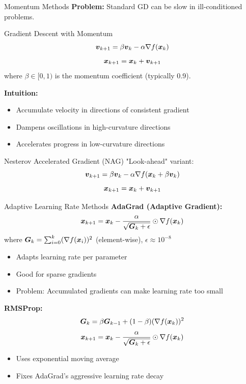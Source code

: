 \documentclass[aspectratio=169]{beamer}
\begin{document}
\begin{frame}{Momentum Methods}
  \textbf{Problem:} Standard GD can be slow in ill-conditioned problems.

  \vspace{0.5em}

  \begin{definitionbox}{Gradient Descent with Momentum}
    $$\boldsymbol{v}_{k+1} = \beta \boldsymbol{v}_k - \alpha \nabla f(\boldsymbol{x}_k)$$
    $$\boldsymbol{x}_{k+1} = \boldsymbol{x}_k + \boldsymbol{v}_{k+1}$$
    where $\beta \in [0,1)$ is the momentum coefficient (typically 0.9).
  \end{definitionbox}

  \vspace{0.5em}

  \textbf{Intuition:}
  \begin{itemize}
    \item Accumulate velocity in directions of consistent gradient
    \item Dampens oscillations in high-curvature directions
    \item Accelerates progress in low-curvature directions
  \end{itemize}

  \vspace{0.5em}

  \begin{definitionbox}{Nesterov Accelerated Gradient (NAG)}
    "Look-ahead" variant:
    $$\boldsymbol{v}_{k+1} = \beta \boldsymbol{v}_k - \alpha \nabla f(\boldsymbol{x}_k + \beta \boldsymbol{v}_k)$$
    $$\boldsymbol{x}_{k+1} = \boldsymbol{x}_k + \boldsymbol{v}_{k+1}$$
  \end{definitionbox}
\end{frame}

\begin{frame}{Adaptive Learning Rate Methods}
  \textbf{AdaGrad (Adaptive Gradient):}
  $$\boldsymbol{x}_{k+1} = \boldsymbol{x}_k - \frac{\alpha}{\sqrt{\boldsymbol{G}_k + \epsilon}} \odot \nabla f(\boldsymbol{x}_k)$$
  where $\boldsymbol{G}_k = \sum_{i=0}^k (\nabla f(\boldsymbol{x}_i))^2$ (element-wise), $\epsilon \approx 10^{-8}$

  \begin{itemize}
    \item Adapts learning rate per parameter
    \item Good for sparse gradients
    \item Problem: Accumulated gradients can make learning rate too small
  \end{itemize}

  \vspace{0.5em}

  \textbf{RMSProp:}
  $$\boldsymbol{G}_k = \beta \boldsymbol{G}_{k-1} + (1-\beta)(\nabla f(\boldsymbol{x}_k))^2$$
  $$\boldsymbol{x}_{k+1} = \boldsymbol{x}_k - \frac{\alpha}{\sqrt{\boldsymbol{G}_k + \epsilon}} \odot \nabla f(\boldsymbol{x}_k)$$

  \begin{itemize}
    \item Uses exponential moving average
    \item Fixes AdaGrad's aggressive learning rate decay
  \end{itemize}
\end{frame}
\end{document}
